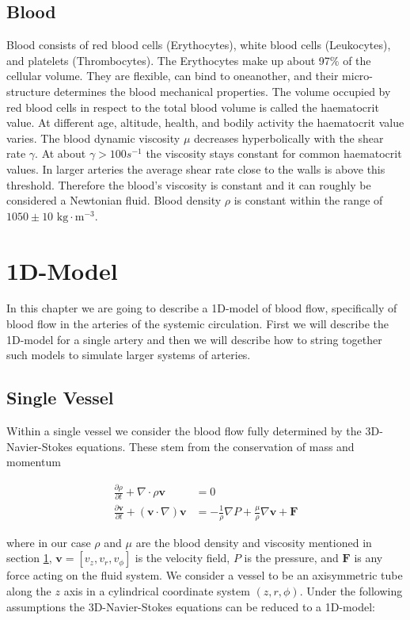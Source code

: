 \documentclass[a4paper, oneside]{discothesis}
\begin{document}
\section{Blood} \label{b}

Blood consists of red blood cells (Erythocytes), white blood cells (Leukocytes), and platelets (Thrombocytes).
The Erythocytes make up about 97\% of the cellular volume.
They are flexible, can bind to oneanother, and their micro-structure determines the blood mechanical properties.
The volume occupied by red blood cells in respect to the total blood volume is called the haematocrit value.
At different age, altitude, health, and bodily activity the haematocrit value varies.
The blood dynamic viscosity $\mu$ decreases hyperbolically with the shear rate $\gamma$.
At about $\gamma > 100s^{-1}$ the viscosity stays constant for common haematocrit values.
In larger arteries the average shear rate close to the walls is above this threshold.
Therefore the blood's viscosity is constant and it can roughly be considered a Newtonian fluid.
Blood density $\rho$ is constant within the range of $1050 \pm 10 \text{ kg}\cdot\text{m}^{-3}$.


\chapter{1D-Model} \label{chap:1dm}
In this chapter we are going to describe a 1D-model of blood flow, specifically of blood flow in the arteries of the systemic circulation.
First we will describe the 1D-model for a single artery and then we will describe how to string together such models to simulate larger systems of arteries.

\section{Single Vessel} \label{sec:sv}
Within a single vessel we consider the blood flow fully determined by the 3D-Navier-Stokes equations.
These stem from the conservation of mass and momentum 

\begin{align}
	\frac{\partial \rho}{\partial t} + \nabla \cdot \rho \mathbf{v} &= 0 \\
	\frac{\partial \mathbf{v}}{\partial t} + \left( \mathbf{v} \cdot \nabla \right) \mathbf{v} &= - \frac{1}{\rho} \nabla P + \frac{\mu}{\rho} \nabla \mathbf{v} + \mathbf{F}
\end{align}

where in our case $\rho$ and $\mu$ are the blood density and viscosity mentioned in section \ref{b}, $\mathbf{v} = \left[ v_z, v_r, v_\phi \right]$ is the velocity field, $P$ is the pressure, and $\mathbf{F}$ is any force acting on the fluid system.
We consider a vessel to be an axisymmetric tube along the $z$ axis in a cylindrical coordinate system $\left(z,r,\phi\right)$.
Under the following assumptions the 3D-Navier-Stokes equations can be reduced to a 1D-model:
\end{document}
